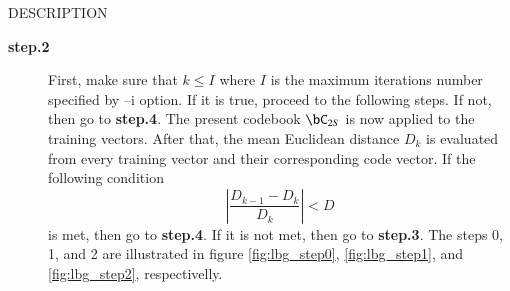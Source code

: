 \begin{qsection}{DESCRIPTION}
\begin{description}
\item[\bf step.2~~~]
First, make sure that $k \le I$ where $I$ is the maximum iterations
number specified by --i option.
If it is true, proceed to the following steps.
If not, then go to {\bf step.4}.
The present codebook $\bC_{2S}$ is now applied
to the training vectors.
After that, the mean Euclidean distance $D_k$ is evaluated
from every training vector and their corresponding code vector.
If the following condition 
\begin{displaymath}
\left|\frac{D_{k-1}-D_{k}}{D_{k}}\right| < D
\end{displaymath}
is met, then go to {\bf step.4}.
If it is not met, then go to {\bf step.3}.
The steps 0, 1, and 2 are illustrated in figure \ref{fig:lbg_step0},
\ref{fig:lbg_step1}, and \ref{fig:lbg_step2}, respectivelly.


\end{description}
\end{qsection}
